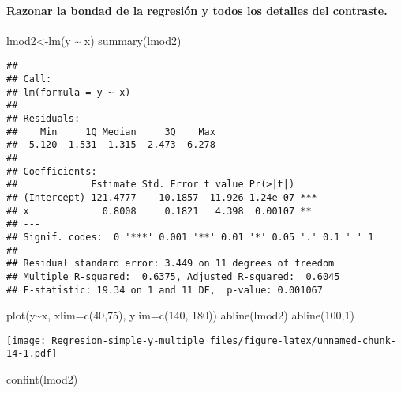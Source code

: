 \documentclass[
]{article}
\newenvironment{Shaded}{\begin{snugshade}}{\end{snugshade}}
\newcommand{\AttributeTok}[1]{\textcolor[rgb]{0.77,0.63,0.00}{#1}}
\newcommand{\DecValTok}[1]{\textcolor[rgb]{0.00,0.00,0.81}{#1}}
\newcommand{\FunctionTok}[1]{\textcolor[rgb]{0.00,0.00,0.00}{#1}}
\newcommand{\NormalTok}[1]{#1}
\newcommand{\OtherTok}[1]{\textcolor[rgb]{0.56,0.35,0.01}{#1}}
\newcommand{\SpecialCharTok}[1]{\textcolor[rgb]{0.00,0.00,0.00}{#1}}
\begin{document}
\hypertarget{razonar-la-bondad-de-la-regresiuxf3n-y-todos-los-detalles-del-contraste.}{%
\paragraph{Razonar la bondad de la regresión y todos los detalles del
contraste.}\label{razonar-la-bondad-de-la-regresiuxf3n-y-todos-los-detalles-del-contraste.}}

\begin{Shaded}
\begin{Highlighting}[]
\NormalTok{lmod2}\OtherTok{\textless{}{-}}\FunctionTok{lm}\NormalTok{(y  }\SpecialCharTok{\textasciitilde{}}\NormalTok{ x)}
\FunctionTok{summary}\NormalTok{(lmod2)}
\end{Highlighting}
\end{Shaded}

\begin{verbatim}
## 
## Call:
## lm(formula = y ~ x)
## 
## Residuals:
##    Min     1Q Median     3Q    Max 
## -5.120 -1.531 -1.315  2.473  6.278 
## 
## Coefficients:
##             Estimate Std. Error t value Pr(>|t|)    
## (Intercept) 121.4777    10.1857  11.926 1.24e-07 ***
## x             0.8008     0.1821   4.398  0.00107 ** 
## ---
## Signif. codes:  0 '***' 0.001 '**' 0.01 '*' 0.05 '.' 0.1 ' ' 1
## 
## Residual standard error: 3.449 on 11 degrees of freedom
## Multiple R-squared:  0.6375, Adjusted R-squared:  0.6045 
## F-statistic: 19.34 on 1 and 11 DF,  p-value: 0.001067
\end{verbatim}

\begin{Shaded}
\begin{Highlighting}[]
\FunctionTok{plot}\NormalTok{(y}\SpecialCharTok{\textasciitilde{}}\NormalTok{x, }\AttributeTok{xlim=}\FunctionTok{c}\NormalTok{(}\DecValTok{40}\NormalTok{,}\DecValTok{75}\NormalTok{), }\AttributeTok{ylim=}\FunctionTok{c}\NormalTok{(}\DecValTok{140}\NormalTok{, }\DecValTok{180}\NormalTok{))}
\FunctionTok{abline}\NormalTok{(lmod2)}
\FunctionTok{abline}\NormalTok{(}\DecValTok{100}\NormalTok{,}\DecValTok{1}\NormalTok{)}
\end{Highlighting}
\end{Shaded}

\texttt{[image: Regresion-simple-y-multiple\_files/figure-latex/unnamed-chunk-14-1.pdf]}

\begin{Shaded}
\begin{Highlighting}[]
\FunctionTok{confint}\NormalTok{(lmod2)}
\end{Highlighting}
\end{Shaded}
\end{document}
